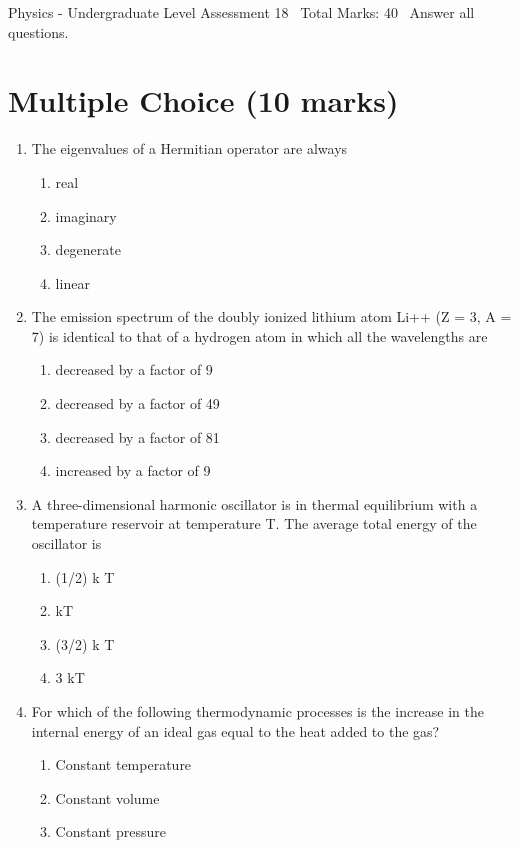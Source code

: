 \documentclass[12pt]{article}
\begin{document}
\begin{center}
Physics - Undergraduate Level Assessment 18 \
Total Marks: 40 \
Answer all questions.
\end{center}

\section*{Multiple Choice (10 marks)}
\begin{enumerate}[label=\arabic*.]
\item The eigenvalues of a Hermitian operator are always
\begin{enumerate}[label=(\alph*)]
    \item real
    \item imaginary
    \item degenerate
    \item linear
\end{enumerate}
\item The emission spectrum of the doubly ionized lithium atom Li++ (Z = 3, A = 7) is identical to that of a hydrogen atom in which all the wavelengths are
\begin{enumerate}[label=(\alph*)]
    \item decreased by a factor of 9
    \item decreased by a factor of 49
    \item decreased by a factor of 81
    \item increased by a factor of 9
\end{enumerate}
\item A three-dimensional harmonic oscillator is in thermal equilibrium with a temperature reservoir at temperature T. The average total energy of the oscillator is
\begin{enumerate}[label=(\alph*)]
    \item (1/2) k T
    \item kT
    \item (3/2) k T
    \item 3 kT
\end{enumerate}
\item For which of the following thermodynamic processes is the increase in the internal energy of an ideal gas equal to the heat added to the gas?
\begin{enumerate}[label=(\alph*)]
    \item Constant temperature
    \item Constant volume
    \item Constant pressure

\end{enumerate}
\end{enumerate}
\end{document}
